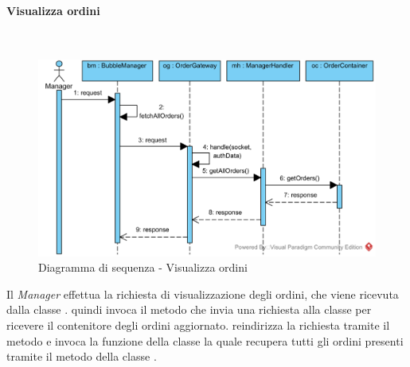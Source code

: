 \paragraph{Visualizza ordini}\mbox{} \\
\nopagebreak
\begin{figure}[H]
	\centering
	\includegraphics[width=15cm]{./diagrammi/sequenza/visualizza_ordini.png}
	\caption{Diagramma di sequenza - Visualizza ordini}
\end{figure}
Il \textit{Manager} effettua la richiesta di visualizzazione degli ordini, che viene ricevuta dalla classe .  quindi invoca il metodo  che invia una richiesta alla classe  per ricevere il contenitore degli ordini aggiornato.  reindirizza la richiesta tramite il metodo  e invoca la funzione  della classe  la quale recupera tutti gli ordini presenti tramite il metodo  della classe .

